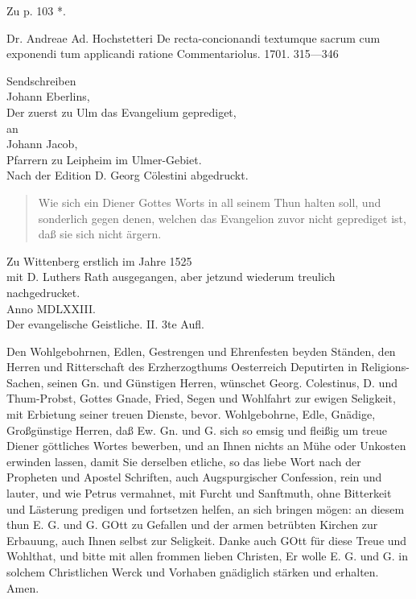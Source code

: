 Zu p. 103 *.

Dr. Andreae Ad. Hochstetteri De recta-concionandi textumque sacrum cum exponendi tum applicandi ratione Commentariolus. 1701. 315—346

\begin{center}
{\Large Sendschreiben}\\[1em]
{\LARGE Johann Eberlins,}\\[1em]
Der zuerst zu Ulm das Evangelium geprediget,\\[0.8em]
an\\[0.8em]
{\Large Johann Jacob,}\\
Pfarrern zu Leipheim im Ulmer-Gebiet.\\[1.5em]
Nach der Edition D. Georg Cölestini abgedruckt.
\end{center}

\begin{quote}
Wie sich ein Diener Gottes Worts in all seinem Thun halten soll, und sonderlich gegen denen, welchen das Evangelion zuvor nicht geprediget ist, daß sie sich nicht ärgern.
\end{quote}

\begin{center}
Zu Wittenberg erstlich im Jahre 1525\\[0.8em]
mit D. Luthers Rath ausgegangen, aber jetzund wiederum treulich nachgedrucket.\\[1.5em]
Anno MDLXXIII.\\[1.5em]
Der evangelische Geistliche. II. 3te Aufl.
\end{center}

Den Wohlgebohrnen, Edlen, Gestrengen und Ehrenfesten beyden Ständen, den Herren und Ritterschaft des Erzherzogthums Oesterreich Deputirten in Religions-Sachen, seinen Gn. und Günstigen Herren, wünschet Georg. Colestinus, D. und Thum-Probst,
Gottes Gnade, Fried, Segen und Wohlfahrt zur ewigen Seligkeit, mit Erbietung seiner treuen Dienste, bevor. Wohlgebohrne, Edle, Gnädige, Großgünstige Herren, daß Ew. Gn. und G. sich so emsig und fleißig um treue Diener göttliches Wortes bewerben, und an Ihnen nichts an Mühe oder Unkosten erwinden lassen, damit Sie derselben etliche, so das liebe Wort nach der Propheten und Apostel Schriften, auch Augspurgischer Confession, rein und lauter, und wie Petrus vermahnet, mit Furcht und Sanftmuth, ohne Bitterkeit und Lästerung predigen und fortsetzen helfen, an sich bringen mögen: an diesem thun E. G. und G. GOtt zu Gefallen und der armen betrübten Kirchen zur Erbauung, auch Ihnen selbst zur Seligkeit. Danke auch GOtt für diese Treue und Wohlthat, und bitte mit allen frommen lieben Christen, Er wolle E. G. und G. in solchem Christlichen Werck und Vorhaben gnädiglich stärken und erhalten. Amen.

